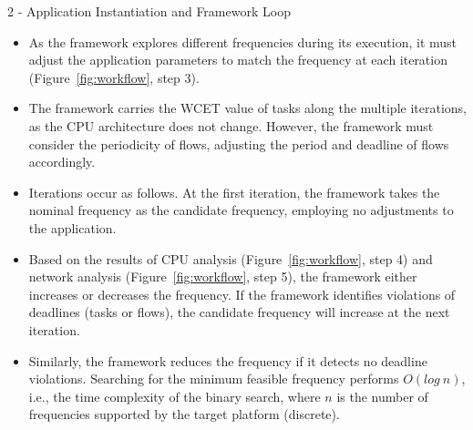 \begin{frame}{2 - Application Instantiation and Framework Loop}
	\begin{itemize}
		\item As the framework explores different frequencies during its execution, it must adjust the application parameters to match the frequency at each iteration (Figure~\ref{fig:workflow}, step 3). 
		
		\item The framework carries the WCET value of tasks along the multiple iterations, as the CPU architecture does not change. However, the framework must consider the periodicity of flows, adjusting the period and deadline of flows accordingly. 
		
		\item Iterations occur as follows. At the first iteration, the framework takes the nominal frequency as the candidate frequency, employing no adjustments to the application. 
		
		\item Based on the results of CPU analysis (Figure~\ref{fig:workflow}, step 4) and network analysis (Figure~\ref{fig:workflow}, step 5), the framework either increases or decreases the frequency. If the framework identifies violations of deadlines (tasks or flows), the candidate frequency will increase at the next iteration. 
		
		\item Similarly, the framework reduces the frequency if it detects no deadline violations. Searching for the minimum feasible frequency performs $O(log \ n)$, i.e., the time complexity of the binary search, where $n$ is the number of frequencies supported by the target platform (discrete).%
	\end{itemize}
\end{frame}



